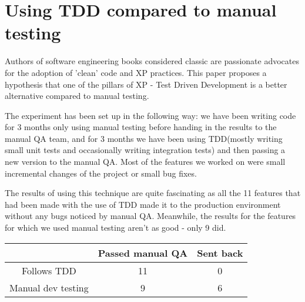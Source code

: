 \documentclass{SHVpaper}
\begin{document}

%
\section {Using TDD compared to manual testing} 



Authors of software engineering books considered classic \cite{fowler_refactoring, martin_clean_code} are passionate advocates for the adoption of 'clean' code and XP practices. This paper proposes a hypothesis that one of the pillars of XP - Test Driven Development \cite{fowler_tdd} is a better alternative compared to manual testing.
 
The experiment has been set up in the following way: we have been writing code for 3 months only using manual testing before handing in the results to the manual QA team, and for 3 months we have been using TDD(mostly writing small unit tests and occasionally writing integration tests) and then passing a new version to the manual QA. Most of the features we worked on were small incremental changes of the project or small bug fixes.

The results of using this technique are quite fascinating as all the 11 features that had been made with the use of TDD made it to the production environment without any bugs noticed by manual QA. Meanwhile, the results for the features for which we used manual testing aren't as good - only 9 did. 


\begin{center}
\begin{tabular}{ |c|c|c| }
\hline
             &  Passed manual QA      &           Sent back      \\ 
\hline
 Follows TDD &     11                 &              0           \\
\hline
 Manual dev testing    &     9                  &              6           \\
\hline

\end{tabular}
\end{center}
\end{document}
